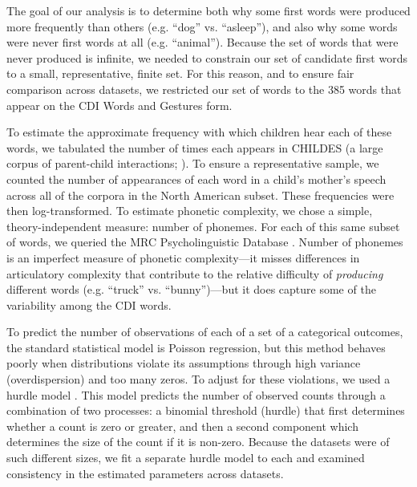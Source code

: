 \documentclass[10pt,letterpaper]{article}
\begin{document}
The goal of our analysis is to determine both why some first words were produced more frequently than others (e.g. ``dog'' vs. ``asleep''), and also why some words were never first words at all (e.g. ``animal''). Because the set of words that were never produced is infinite, we needed to constrain our set of candidate first words to a small, representative, finite set. For this reason, and to ensure fair comparison across datasets, we restricted our set of words to the 385 words that appear on the CDI Words and Gestures form. 


To estimate the approximate frequency with which children hear each of these words, we tabulated the number of times each appears in CHILDES (a large corpus of parent-child interactions;  ). To ensure a representative sample, we counted the number of appearances of each word in a child's mother's speech across all of the corpora in the North American subset. These frequencies were then log-transformed.  To estimate phonetic complexity, we chose a simple, theory-independent measure: number of phonemes. For each of this same subset of words, we queried the MRC Psycholinguistic Database \cite{Wilson1988}. Number of phonemes is an imperfect measure of phonetic complexity---it misses differences in articulatory complexity that contribute to the relative difficulty of \emph{producing} different words (e.g. ``truck'' vs. ``bunny'')---but it does capture some of the variability among the CDI words.

To predict the number of observations of each of a set of a categorical outcomes, the standard statistical model is Poisson regression, but this method behaves poorly when distributions violate its assumptions through high variance (overdispersion) and too many zeros. To adjust for these violations, we used a hurdle model \cite{mullahy1986}. This model predicts the number of observed counts through a combination of two processes: a binomial threshold (hurdle) that first determines whether a count is zero or greater, and then a second component which determines the size of the count if it is non-zero. Because the datasets were of such different sizes, we fit a separate hurdle model to each and examined consistency in the estimated parameters across datasets.
\end{document}
